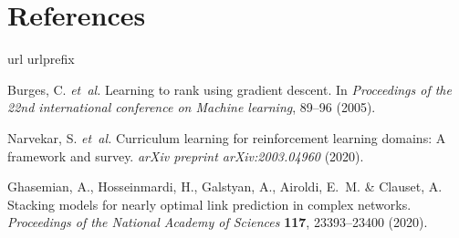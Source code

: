 \documentclass{nature}
\begin{document}
\section{References}


\begin{thebibliography}{1}
  \expandafter\ifx\csname url\endcsname\relax
    \def\url#1{\texttt{#1}}\fi
  \expandafter\ifx\csname urlprefix\endcsname\relax\def\urlprefix{URL }\fi
  \providecommand{\bibinfo}[2]{#2}
  \providecommand{\eprint}[2][]{\url{#2}}
  
  \bibinfo{author}{Burges, C.} \emph{et~al.}
  \newblock \bibinfo{title}{Learning to rank using gradient descent}.
  \newblock In \emph{\bibinfo{booktitle}{Proceedings of the 22nd international
    conference on Machine learning}}, \bibinfo{pages}{89--96}
    (\bibinfo{year}{2005}).
  
  \bibinfo{author}{Narvekar, S.} \emph{et~al.}
  \newblock \bibinfo{title}{Curriculum learning for reinforcement learning
    domains: A framework and survey}.
  \newblock \emph{\bibinfo{journal}{arXiv preprint arXiv:2003.04960}}
    (\bibinfo{year}{2020}).
  
  \bibinfo{author}{Ghasemian, A.}, \bibinfo{author}{Hosseinmardi, H.},
    \bibinfo{author}{Galstyan, A.}, \bibinfo{author}{Airoldi, E.~M.} \&
    \bibinfo{author}{Clauset, A.}
  \newblock \bibinfo{title}{Stacking models for nearly optimal link prediction in
    complex networks}.
  \newblock \emph{\bibinfo{journal}{Proceedings of the National Academy of
    Sciences}} \textbf{\bibinfo{volume}{117}}, \bibinfo{pages}{23393--23400}
    (\bibinfo{year}{2020}).
  
  \end{thebibliography}
\end{document}
